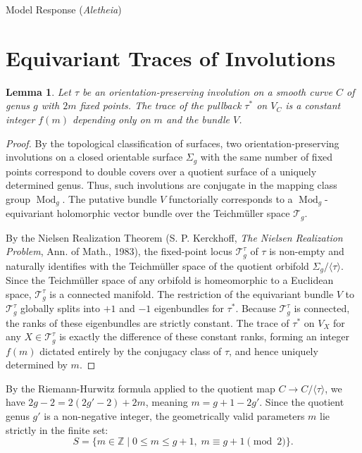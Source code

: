 \documentclass{article}
\theoremstyle{plain}
\newtheorem{lemma}{Lemma}
\theoremstyle{definition}
\newcommand{\Aletheia}{\emph{Aletheia}}
\begin{document}
\begin{solution}{Model Response (\Aletheia)}
\section{Equivariant Traces of Involutions}

\begin{lemma} \label{lem:constant_trace}
Let $\tau$ be an orientation-preserving involution on a smooth curve $C$ of genus $g$ with $2m$ fixed points. The trace of the pullback $\tau^*$ on $V_C$ is a constant integer $f(m)$ depending only on $m$ and the bundle $V$.
\end{lemma}

\begin{proof}
By the topological classification of surfaces, two orientation-preserving involutions on a closed orientable surface $\Sigma_g$ with the same number of fixed points correspond to double covers over a quotient surface of a uniquely determined genus. Thus, such involutions are conjugate in the mapping class group $\operatorname{Mod}_g$. The putative bundle $V$ functorially corresponds to a $\operatorname{Mod}_g$-equivariant holomorphic vector bundle over the Teichm\"uller space $\mathcal{T}_g$.

By the Nielsen Realization Theorem (S. P. Kerckhoff, \textit{The Nielsen Realization Problem}, Ann. of Math., 1983), the fixed-point locus $\mathcal{T}_g^\tau$ of $\tau$ is non-empty and naturally identifies with the Teichm\"uller space of the quotient orbifold $\Sigma_g / \langle \tau \rangle$. Since the Teichm\"uller space of any orbifold is homeomorphic to a Euclidean space, $\mathcal{T}_g^\tau$ is a connected manifold. The restriction of the equivariant bundle $V$ to $\mathcal{T}_g^\tau$ globally splits into $+1$ and $-1$ eigenbundles for $\tau^*$. Because $\mathcal{T}_g^\tau$ is connected, the ranks of these eigenbundles are strictly constant. The trace of $\tau^*$ on $V_X$ for any $X \in \mathcal{T}_g^\tau$ is exactly the difference of these constant ranks, forming an integer $f(m)$ dictated entirely by the conjugacy class of $\tau$, and hence uniquely determined by $m$.
\end{proof}

By the Riemann-Hurwitz formula applied to the quotient map $C \to C/\langle\tau\rangle$, we have $2g - 2 = 2(2g' - 2) + 2m$, meaning $m = g + 1 - 2g'$. Since the quotient genus $g'$ is a non-negative integer, the geometrically valid parameters $m$ lie strictly in the finite set:
\[ S = \{ m \in \mathbb{Z} \mid 0 \le m \le g+1, \; m \equiv g+1 \pmod 2 \}. \]


\end{solution}
\end{document}
